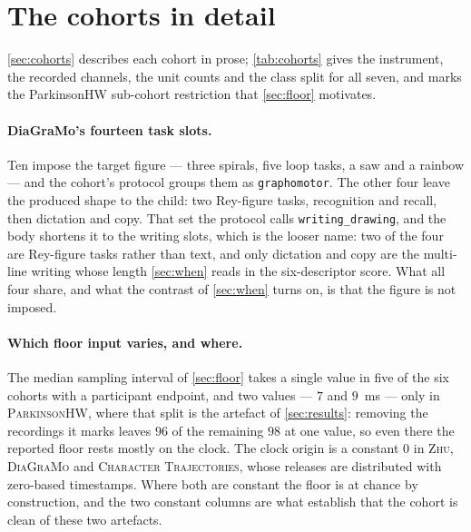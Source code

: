 \documentclass[10pt,a4paper]{article}
\begin{document}
\clearpage



\clearpage
\appendix

\section{The cohorts in detail}
\label{sec:cohorts-appendix}

\cref{sec:cohorts} describes each cohort in prose; \cref{tab:cohorts} gives the instrument, the
recorded channels, the unit counts and the class split for all seven, and marks the ParkinsonHW
sub-cohort restriction that \cref{sec:floor} motivates.



\paragraph{DiaGraMo's fourteen task slots.} Ten impose the target figure --- three spirals, five
loop tasks, a saw and a rainbow --- and the cohort's protocol groups them as \texttt{graphomotor}.
The other four leave the produced shape to the child: two Rey-figure tasks, recognition and recall,
then dictation and copy. That set the protocol calls \texttt{writing\_drawing}, and the body
shortens it to the writing slots, which is the looser name: two of the four are Rey-figure tasks
rather than text, and only dictation and copy are the multi-line writing whose length
\cref{sec:when} reads in the six-descriptor score. What all four share, and what the contrast of
\cref{sec:when} turns on, is that the figure is not imposed.

\paragraph{Which floor input varies, and where.} The median sampling interval of
\cref{sec:floor} takes a single value in five of the six cohorts with a participant endpoint, and
two values --- $7$ and $9$~ms --- only in \textsc{ParkinsonHW}, where that split is the artefact of
\cref{sec:results}: removing the recordings it marks leaves $96$ of the remaining $98$ at one value,
so even there the reported floor rests mostly on the clock. The clock origin is a constant $0$ in
\textsc{Zhu}, \textsc{DiaGraMo} and \textsc{Character Trajectories}, whose releases are distributed
with zero-based timestamps. Where both are constant the floor is at chance by construction, and the
two constant columns are what establish that the cohort is clean of these two artefacts.
\end{document}
